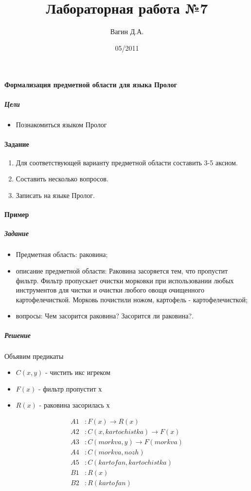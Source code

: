 \documentclass[a4paper,12pt]{article}
\title{Лабораторная работа №7}
\author{Вагин Д.А.}
\date{05/2011}
\begin{document}

\paragraph{Формализация предметной области для языка Пролог}
\subparagraph{Цели}
\begin{itemize}
	\item Познакомиться языком Пролог
\end{itemize}

\paragraph{Задание}
\begin{enumerate}
	\item Для соответствующей варианту предметной области составить 3-5 аксиом.
	\item Составить несколько вопросов.
	\item Записать на языке Пролог.
\end{enumerate}

\paragraph{Пример}
\subparagraph{Задание}
\begin{itemize}
	\item Предметная область: раковина;
	\item описание предметной области: Раковина засоряется тем, что пропустит фильтр. Фильтр пропускает очистки морковки при использовании любых инструментов для чистки и очистки любого овощя очищенного картофелечисткой. Морковь почистили ножом, картофель - картофелечисткой;
	\item вопросы: Чем засорится раковина? Засорится ли раковина?.
\end{itemize}

\subparagraph{Решение}
Объявим предикаты
\begin{itemize}
	\item $C(x,y)$ - чистить икс игреком
	\item $F(x)$ - фильтр пропустит х
	\item $R(x)$ - раковина засорилась х
\end{itemize}

\begin{align*}
A1&: F(x) \to R(x)\\
A2&: C(x, kartochistka) \to F(x)\\
A3&: C(morkva, y) \to F(morkva)\\
A4&: C(morkva, nozh)\\
A5&: C(kartofan, kartochistka)\\
B1&: R(x)\\
B2&: R(kartofan)\\
\end{align*}
\end{document}
